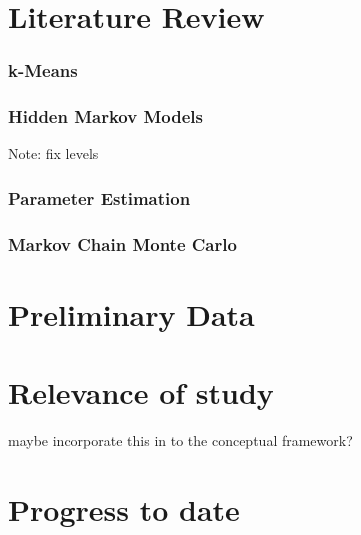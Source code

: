 \documentclass[12pt,a4paper]{article}
\author{D Maderazo}
\begin{document}
    
    \section{Literature Review}
    
        \subsubsection{k-Means}
        
        \subsubsection{Hidden Markov Models}
        Note: fix levels
        
         
        
        \subsubsection{Parameter Estimation}
        
        
        \subsubsection{Markov Chain Monte Carlo}
        
            
            
        
    \section{Preliminary Data}
    \section{Relevance of study}
        maybe incorporate this in to the conceptual framework?
        
    \section{Progress to date}
    
    

\end{document}
